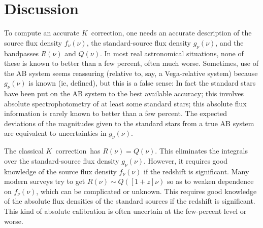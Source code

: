 \documentclass[preprint]{aastex}
\newcommand{\kcorrection}{$K$~correction}
\begin{document}
\section{Discussion}

To compute an accurate \kcorrection, one needs an accurate description
of the source flux density $f_{\nu}(\nu)$, the standard-source flux
density $g_{\nu}(\nu)$, and the bandpasses $R(\nu)$ and $Q(\nu)$.  In
most real astronomical situations, none of these is known to better
than a few percent, often much worse.  Sometimes, use of the AB system
seems reassuring (relative to, say, a Vega-relative system) because
$g_{\nu}(\nu)$ is known (ie, defined), but this is a false sense: In
fact the standard stars have been put on the AB system to the best
available accuracy; this involves absolute spectrophotometry of at
least some standard stars; this absolute flux information is rarely
known to better than a few percent.  The expected deviations of the
magnitudes given to the standard stars from a true AB system are
equivalent to uncertainties in $g_{\nu}(\nu)$.

The classical \kcorrection\ has $R(\nu)=Q(\nu)$.  This eliminates the
integrals over the standard-source flux density $g_{\nu}(\nu)$.
However, it requires good knowledge of the source flux density
$f_{\nu}(\nu)$ if the redshift is significant.  Many modern surveys
try to get $R(\nu)\sim Q([1+z]\nu)$ so as to weaken dependence on
$f_{\nu}(\nu)$, which can be complicated or unknown.  This requires
good knowledge of the absolute flux densities of the standard sources
if the redshift is significant.  This kind of absolute calibration is
often uncertain at the few-percent level or worse.



\end{document}
